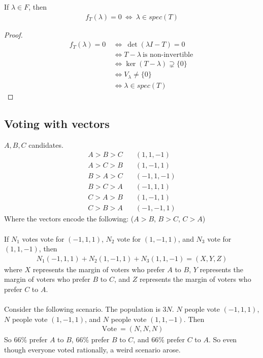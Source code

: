 \documentclass[class=scrartcl, crop=false]{standalone}
\begin{document}
\begin{theorem}
  If $\lambda \in F$, then 
  \begin{gather*}
    f_T(\lambda) = 0 \ \Leftrightarrow \ \lambda \in spec(T)
  \end{gather*}
  \begin{proof}
    \begin{align*}
      f_T(\lambda) = 0 \ & \Leftrightarrow \ \det(\lambda I - T) = 0 \\
      & \Leftrightarrow T - \lambda \ \text{is non-invertible} \ \\
      & \Leftrightarrow \ker(T - \lambda) \supsetneq \{0\} \\
      & \Leftrightarrow V_\lambda \neq \{0\} \\
      & \Leftrightarrow \lambda \in spec(T)
    \end{align*}  
  \end{proof} 
\end{theorem} 

\subsection{Voting with vectors}

$A, B, C$ candidates.
\begin{align*}
  A > B > C \quad & (1, 1, -1) \\
  A > C > B \quad & (1, -1, 1) \\
  B > A > C \quad & (-1, 1, -1) \\
  B > C > A \quad & (-1, 1, 1) \\
  C > A > B \quad & (1, -1, 1) \\
  C > B > A \quad & (-1, -1, 1)
\end{align*} 
Where the vectors encode the following: ($A > B$, $B > C$, $C > A$)
\\\\
If $N_1$ votes vote for $(-1, 1, 1)$, $N_2$ vote for $(1, -1, 1)$, and $N_3$ vote for $(1, 1, -1)$, then 
\begin{gather*}
  N_1(-1, 1, 1) + N_2(1, -1, 1) + N_3(1, 1, -1) = (X, Y, Z)
\end{gather*} 
where $X$ represents the margin of voters who prefer $A$ to $B$, $Y$ represents the margin of voters who prefer $B$ to $C$, and $Z$ represents the margin of voters who prefer $C$ to $A$.
\\\\
Consider the following scenario. The population is $3N$. $N$ people vote $(-1, 1, 1)$, $N$ people vote $(1, -1, 1)$, and $N$ people vote $(1, 1, -1)$. Then
\begin{gather*}
  \ \text{Vote} \ = (N, N, N)
\end{gather*} 
So $66\%$ prefer $A$ to $B$, $66\%$ prefer $B$ to $C$, and $66\%$ prefer $C$ to $A$. So even though everyone voted rationally, a weird scenario arose.
\end{document}
